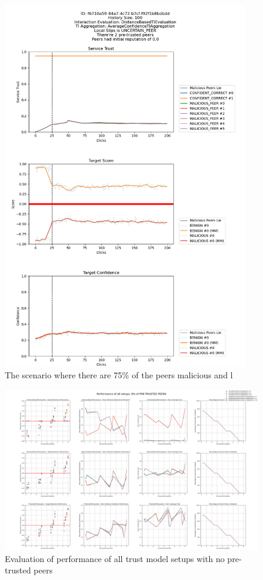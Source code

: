 \begin{figure}
    \centering
    \includegraphics[width=0.95\textwidth]{assets/best_worst_case}
    \caption{The scenario where there are 75\% of the peers malicious and l}
    \label{fig:worst-best-scenario}
\end{figure}

\begin{figure}
    \centering
    \includegraphics[width=0.9\paperwidth, angle=90]{assets/0_all_metrics.png}
    \caption{Evaluation of performance of all trust model setups with no pre-trusted peers}
    \label{fig:performance-all-setups-0-pretrusted}
\end{figure}

